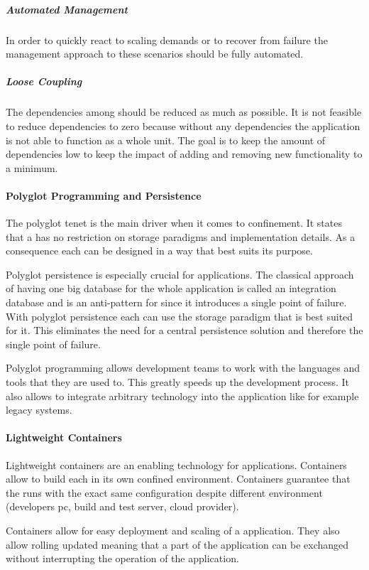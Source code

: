 \subparagraph{Automated Management}
In order to quickly react to scaling demands or to recover from failure the
management approach to these scenarios should be fully automated.

\subparagraph{Loose Coupling}

The dependencies among \mss{} should be reduced as much as possible. It is not
feasible to reduce dependencies to zero because without any dependencies the
application is not able to function as a whole unit. The goal is to keep the
amount of dependencies low to keep the impact of adding and removing new
functionality to a minimum.

\paragraph{Polyglot Programming and Persistence}

The polyglot tenet is the main driver when it comes to \ms{} confinement. It
states that a \ms{} has no restriction on storage paradigms and implementation
details. As a consequence each \ms{} can be designed in a way that best suits
its purpose.

Polyglot persistence is especially crucial for \ms{} applications. The classical
approach of having one big database for the whole application is called an
integration database and is an anti-pattern for \mss{} since it introduces a
single point of failure. With polyglot persistence each \ms{} can use the
storage paradigm that is best suited for it. This eliminates the need for a
central persistence solution and therefore the single point of failure.

Polyglot programming allows development teams to work with the languages and
tools that they are used to. This greatly speeds up the development process. It
also allows to integrate arbitrary technology into the application like for
example legacy systems.

\paragraph{Lightweight Containers}

Lightweight containers are an enabling technology for \ms{} applications.
Containers allow to build each \ms{} in its own confined environment. Containers
guarantee that the \ms{} runs with the exact same configuration despite
different environment (developers pc, build and test server, cloud provider).

Containers allow for easy deployment and scaling of a \ms{} application. They
also allow rolling updated meaning that a part of the application can be
exchanged without interrupting the operation of the application.


